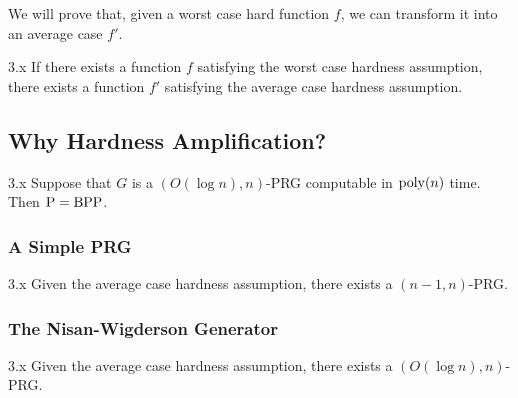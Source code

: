 \documentclass[11pt]{article}
\begin{document}
We will prove that, given a worst case hard function $f$, we can transform it into an average case $f'$.

\begin{theorem}{3.x} If there exists a function $f$ satisfying the worst case hardness assumption, there exists a function $f'$ satisfying the average case hardness assumption.

\end{theorem}

\subsection{Why Hardness Amplification?}

\begin{theorem}{3.x} Suppose that $G$ is a $(O(\log n), n)$-PRG computable in $\mathrm{poly}(n)$ time. Then $\mathrm{P} = \mathrm{BPP}$.
\end{theorem}

\subsubsection{A Simple PRG}

\begin{theorem}{3.x}
    Given the average case hardness assumption, there exists a $(n - 1, n)$-PRG.
\end{theorem}

\subsubsection{The Nisan-Wigderson Generator}

\begin{theorem}{3.x}
    Given the average case hardness assumption, there exists a $(O(\log n), n)$-PRG.
\end{theorem}
\end{document}
